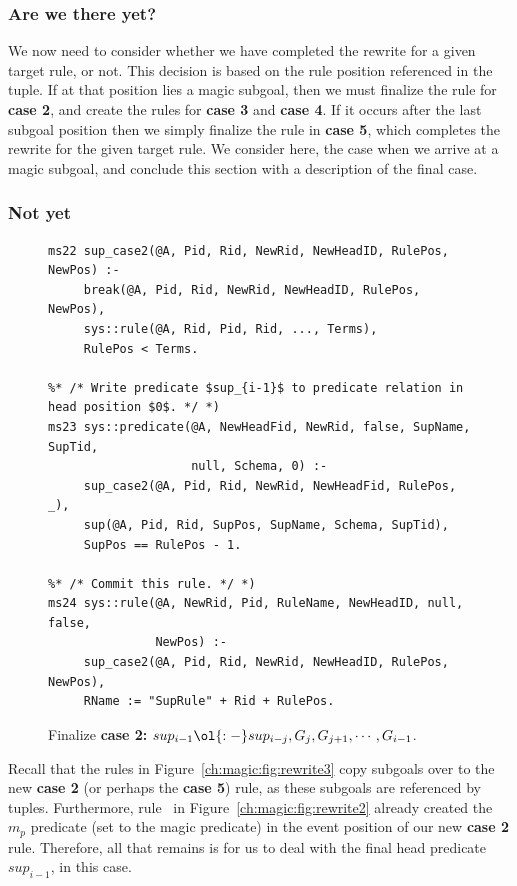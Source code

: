 \subsubsection{Are we there yet?}

We now need to consider whether we have completed the rewrite for a given
target rule, or not.  This decision is based on the rule position referenced in
the  tuple.  If at that position lies a magic subgoal, then we must
finalize the rule for {\bf case 2}, and create the rules for {\bf case 3}
and {\bf case 4}.  If it occurs after the last subgoal position then we simply
finalize the rule in {\bf case 5}, which completes the rewrite for the given
target rule.  We consider here, the case when we arrive at a magic subgoal, and
conclude this section with a description of the final case.

\subsubsection{Not yet}

\begin{figure}[!t]
\ssp
\centering
\begin{lstlisting}
ms22 sup_case2(@A, Pid, Rid, NewRid, NewHeadID, RulePos, NewPos) :-
     break(@A, Pid, Rid, NewRid, NewHeadID, RulePos, NewPos),
     sys::rule(@A, Rid, Pid, Rid, ..., Terms),
     RulePos < Terms.

%* /* Write predicate $sup_{i-1}$ to predicate relation in head position $0$. */ *)
ms23 sys::predicate(@A, NewHeadFid, NewRid, false, SupName, SupTid, 
                    null, Schema, 0) :-
     sup_case2(@A, Pid, Rid, NewRid, NewHeadFid, RulePos, _),
     sup(@A, Pid, Rid, SupPos, SupName, Schema, SupTid),
     SupPos == RulePos - 1.
  
%* /* Commit this rule. */ *)
ms24 sys::rule(@A, NewRid, Pid, RuleName, NewHeadID, null, false, 
               NewPos) :-
     sup_case2(@A, Pid, Rid, NewRid, NewHeadID, RulePos, NewPos),
     RName := "SupRule" + Rid + RulePos.
\end{lstlisting}
\caption{\label{ch:magic:fig:rewrite5} 
Finalize {\bf case 2:} $sup_{i-1} \ol{:-} sup_{i-j}, G_j, G_{j+1}, \cdots, G_{i-1}$.}
\end{figure}

Recall that the rules in Figure~\ref{ch:magic:fig:rewrite3} copy subgoals over
to the new {\bf case 2} (or perhaps the {\bf case 5}) rule, as these subgoals are
referenced by  tuples.  Furthermore, rule~ in
Figure~\ref{ch:magic:fig:rewrite2} already created the $m_p$ predicate (set to
the magic predicate) in the event position of our new {\bf case 2} rule.
Therefore, all that remains is for us to deal with the final head predicate
$sup_{i-1}$, in this case.

